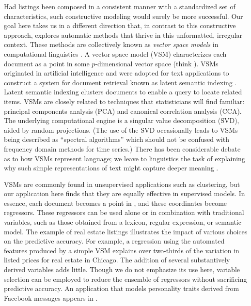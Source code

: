 \documentclass[12pt]{article}
\begin{document}
 Had listings been composed in a consistent manner with a standardized set of
 characteristics, such constructive modeling would surely be more successful.
  Our goal here takes us in a different direction that, in contrast to this
 constructive approach, explores automatic methods that thrive in this
 unformatted, irregular context.  These methods are collectively known as {\em
 vector space models} in computational linguistics \citep[e.g.][]{turney10}.  A
 vector space model (VSM) characterizes each document as a point in some
 $p$-dimensional vector space (think \Rp).  VSMs originated in artificial
 intelligence and were adopted for text applications to construct a system for
 document retrieval known as latent semantic indexing \citep{deerwester88}.
  Latent semantic indexing clusters documents to enable a query to locate
 related items.  VSMs are closely related to techniques that statisticians will
 find familiar: principal components analysis (PCA) and canonical correlation
 analysis (CCA).  The underlying computational engine is a singular value
 decomposition (SVD), aided by random projections.  (The use of the SVD
 occasionally leads to VSMs being described as ``spectral algorithms'' which
 should not be confused with frequency domain methods for time series.)  There
 has been considerable debate as to how VSMs represent language; we leave to
 linguistics the task of explaining why such simple representations of text
 might capture deeper meaning \citep{deerwester90, landauer97, bullinaria07,
 turney10}.


 VSMs are commonly found in unsupervised applications such as clustering, but
 our application here finds that they are equally effective in supervised
 models.  In essence, each document becomes a point in \Rp, and these
 coordinates become regressors.  These regressors can be used alone or in
 combination with traditional variables, such as those obtained from a lexicon,
 regular expression, or semantic model.  The example of real estate listings
 illustrates the impact of various choices on the predictive accuracy.  For
 example, a regression using the automated features produced by a simple VSM
 explains over two-thirds of the variation in listed prices for real estate in
 Chicago.  The addition of several substantively derived variables adds little.
  Though we do not emphasize its use here, variable selection can be employed to
 reduce the ensemble of regressors without sacrificing predictive accuracy.  An application that models personality traits derived from Facebook
 messages appears in \citet{ungar13}.
\end{document}
